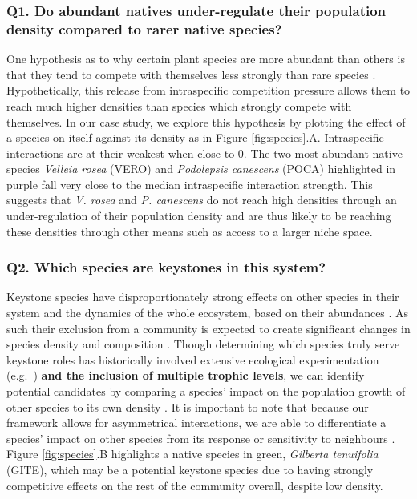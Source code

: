 \documentclass[a4,12pt]{article}
\begin{document}
\begin{refsection}
    \subsubsection*{Q1. Do abundant natives under-regulate their population density compared to rarer native species?}
    One hypothesis as to why certain plant species are more abundant than others is that they tend to compete with themselves less strongly than rare species \parencite{Yenni2012, Yenni2017}. Hypothetically, this release from intraspecific competition pressure allows them to reach much higher densities than species which strongly compete with themselves. In our case study, we explore this hypothesis by plotting the effect of a species on itself against its density as in Figure \ref{fig:species}.A. Intraspecific interactions are at their weakest when close to $0$. The two most abundant native species \textit{Velleia rosea} (VERO) and \textit{Podolepsis canescens} (POCA) highlighted in purple fall very close to the median intraspecific interaction strength. This suggests that \textit{V. rosea} and \textit{P. canescens} do not reach high densities through an under-regulation of their population density and are thus likely to be reaching these densities through other means such as access to a larger niche space. 

    \subsubsection*{Q2. Which species are keystones in this system?}
    Keystone species have disproportionately strong effects on other species in their system and the dynamics of the whole ecosystem, based on their abundances \parencite{Power1996, Piraino2002, Libralato2006}. As such their exclusion from a community is expected to create significant changes in species density and composition \parencite{Paine1969}. Though determining which species truly serve keystone roles has historically involved extensive ecological experimentation (e.g.\ \cite{Paine1992}) \textbf{and the inclusion of multiple trophic levels}, we can identify potential candidates by comparing a species' impact on the population growth of other species to its own density \parencite{Libralato2006}. It is important to note that because our framework allows for asymmetrical interactions, we are able to differentiate a species' impact on other species from its response or sensitivity to neighbours \parencite{Broekman2020}. Figure \ref{fig:species}.B highlights a native species in green, \textit{Gilberta tenuifolia} (GITE), which may be a potential keystone species due to having strongly competitive effects on the rest of the community overall, despite low density. 


\end{refsection}
\end{document}
